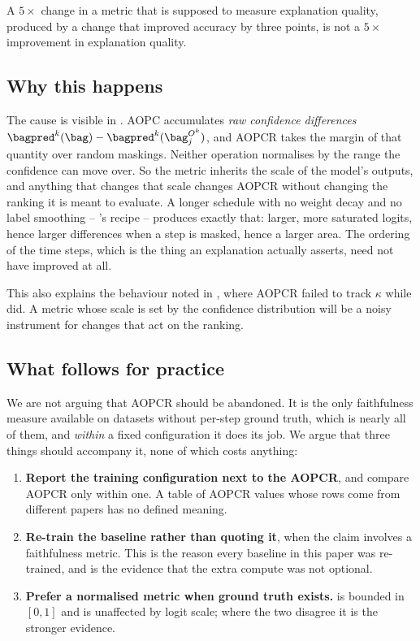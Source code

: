 A $5\times$ change in a metric that is supposed to measure explanation quality, produced by a change
that improved accuracy by three points, is not a $5\times$ improvement in explanation quality.

\subsection{Why this happens}
\label{sec:aopcr:why}

The cause is visible in . AOPC accumulates \emph{raw confidence differences}
$\bagpred^{k}(\bag) - \bagpred^{k}(\bag^{O^k}_{j})$, and AOPCR takes the margin of that quantity over
random maskings. Neither operation normalises by the range the confidence can move over. So the
metric inherits the scale of the model's outputs, and anything that changes that scale changes AOPCR
without changing the ranking it is meant to evaluate. A longer schedule with no weight decay and no
label smoothing -- \millet{}'s recipe -- produces exactly that: larger, more saturated logits, hence
larger differences when a step is masked, hence a larger area. The ordering of the time steps, which
is the thing an explanation actually asserts, need not have improved at all.

This also explains the behaviour noted in , where AOPCR failed to track
$\kappa$ while \ndcg{} did. A metric whose scale is set by the confidence distribution will be a
noisy instrument for changes that act on the ranking.

\subsection{What follows for practice}
\label{sec:aopcr:protocol}

We are not arguing that AOPCR should be abandoned. It is the only faithfulness measure available on
datasets without per-step ground truth, which is nearly all of them, and \emph{within} a fixed
configuration it does its job. We argue that three things should accompany it, none of which costs
anything:

\begin{enumerate}
  \item \textbf{Report the training configuration next to the AOPCR}, and compare AOPCR only within
        one. A table of AOPCR values whose rows come from different papers has no defined meaning.
  \item \textbf{Re-train the baseline rather than quoting it}, when the claim involves a
        faithfulness metric. This is the reason every baseline in this paper was re-trained, and
         is the evidence that the extra compute was not optional.
  \item \textbf{Prefer a normalised metric when ground truth exists.} \ndcg{} is bounded in $[0,1]$
        and is unaffected by logit scale; where the two disagree it is the stronger evidence.
\end{enumerate}

